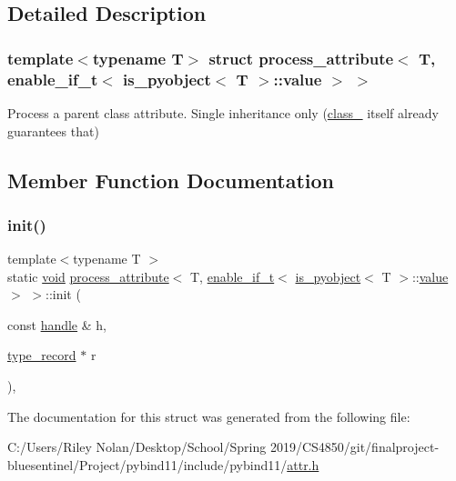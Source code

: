\subsection{Detailed Description}
\subsubsection*{template$<$typename T$>$\newline
struct process\+\_\+attribute$<$ T, enable\+\_\+if\+\_\+t$<$ is\+\_\+pyobject$<$ T $>$\+::value $>$ $>$}

Process a parent class attribute. Single inheritance only (\mbox{\hyperlink{classclass__}{class\+\_\+}} itself already guarantees that) 

\subsection{Member Function Documentation}
\mbox{\label{structprocess__attribute_3_01_t_00_01enable__if__t_3_01is__pyobject_3_01_t_01_4_1_1value_01_4_01_4_ab3249240a84f686a0339448dc63b1841}} 
\subsubsection{\texorpdfstring{init()}{init()}}
{\footnotesize\ttfamily template$<$typename T $>$ \\
static \mbox{\hyperlink{_s_d_l__opengles2__gl2ext_8h_ae5d8fa23ad07c48bb609509eae494c95}{void}} \mbox{\hyperlink{structprocess__attribute}{process\+\_\+attribute}}$<$ T, \mbox{\hyperlink{detail_2common_8h_a012819c9e8b5e04872a271f50f8b8196}{enable\+\_\+if\+\_\+t}}$<$ \mbox{\hyperlink{pytypes_8h_a41ef7089a656c80c4319844f62409f7d}{is\+\_\+pyobject}}$<$ T $>$\+::\mbox{\hyperlink{_s_d_l__opengl__glext_8h_a8ad81492d410ff2ac11f754f4042150f}{value}} $>$ $>$\+::init (\begin{DoxyParamCaption}\item[{const \mbox{\hyperlink{classhandle}{handle}} \&}]{h,  }\item[{\mbox{\hyperlink{structtype__record}{type\+\_\+record}} $\ast$}]{r }\end{DoxyParamCaption})\hspace{0.3cm}{\ttfamily [inline]}, {\ttfamily [static]}}



The documentation for this struct was generated from the following file\+:\begin{DoxyCompactItemize}
\item 
C\+:/\+Users/\+Riley Nolan/\+Desktop/\+School/\+Spring 2019/\+C\+S4850/git/finalproject-\/bluesentinel/\+Project/pybind11/include/pybind11/\mbox{\hyperlink{attr_8h}{attr.\+h}}\end{DoxyCompactItemize}
